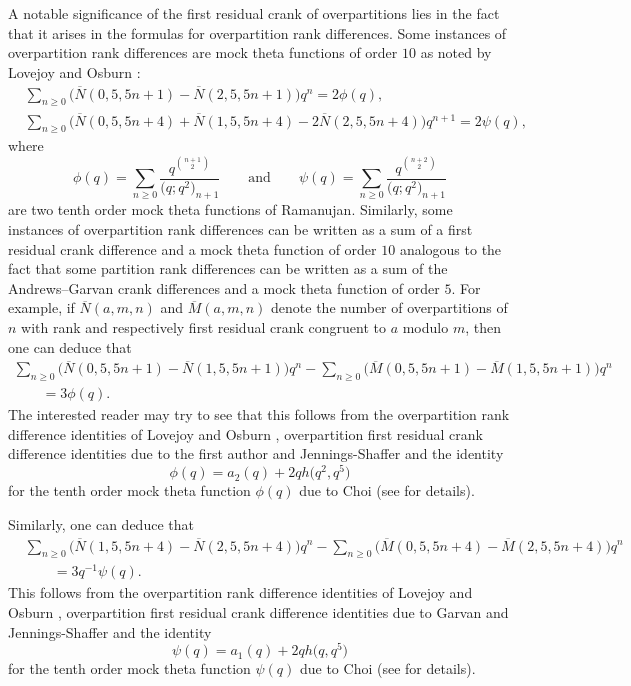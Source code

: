 \documentclass[pdftex]{sigma}
\numberwithin{equation}{section}
\begin{document}
A notable significance of the first residual crank of overpartitions lies in the fact that it arises in the formulas for overpartition rank differences. Some instances of overpartition rank differences are mock theta functions of order $10$ as noted by Lovejoy and Osburn \cite[p.~197]{Lo-Os10}:
\begin{align*}
&\sum_{n\geq 0}\bigl(\overline{N}(0,5,5n+1)-\overline{N}(2,5,5n+1)\bigr)q^n=2\phi(q),
\\
&\sum_{n\geq 0}\bigl(\overline{N}(0,5,5n+4)+\overline{N}(1,5,5n+4)-2\overline{N}(2,5,5n+4)\bigr)q^{n+1}=2\psi(q),
\end{align*}
where
\begin{equation*}
\phi(q)=\sum\limits_{n\geq 0}\frac{q^{\binom{n+1}{2}}}{\bigl(q;q^2\bigr)_{n+1}}
\qquad\mbox{and}\qquad
\psi(q)=\sum\limits_{n\geq 0}\frac{q^{\binom{n+2}{2}}}{\bigl(q;q^2\bigr)_{n+1}}
\end{equation*}
are two tenth order mock theta functions of Ramanujan.
Similarly, some instances of overpartition rank differences can be written as a sum of a first residual crank difference and a mock theta function of order $10$ analogous to the fact that some partition rank differences can be written as a sum of the Andrews--Garvan crank differences and a mock theta function of order $5$. For example, if $\overline{N}(a,m,n)$ and $\overline{M}(a,m,n)$ denote the number of overpartitions of $n$ with rank and respectively first residual crank congruent to $a$ modulo $m$, then one can deduce that
\begin{gather*}
\sum_{n\geq 0}\bigl(\overline{N}(0,5,5n+1)-\overline{N}(1,5,5n+1)\bigr)q^n-\sum_{n\geq 0}\bigl(\overline{M}(0,5,5n+1)-\overline{M}(1,5,5n+1)\bigr)q^n \\
\qquad{}=3\phi(q).
\end{gather*}
The interested reader may try to see that this follows from the overpartition rank difference identities of Lovejoy and Osburn {\cite[equations~(1.6) and~(1.11)]{Lo-Os08}}, overpartition first residual crank difference identities due to the first author and Jennings-Shaffer \cite[Theorem~2.10]{Ga-Sh} and the identity
\begin{equation*}%
\phi(q)=a_2(q)+2qh\bigl(q^2,q^5\bigr)
\end{equation*}
for the tenth order mock theta function $\phi(q)$ due to Choi (see \cite[p. 534]{Ch99} for details).

Similarly, one can deduce that
\begin{align*}
&{}\sum_{n\geq 0}\bigl(\overline{N}(1,5,5n+4)-\overline{N}(2,5,5n+4)\bigr)q^n-\sum_{n\geq 0}\bigl(\overline{M}(0,5,5n+4)-\overline{M}(2,5,5n+4)\bigr)q^n \\
&{}\qquad{}=3q^{-1}\psi(q).
\end{align*}
This follows from the overpartition rank difference identities of Lovejoy and Osburn \cite[equations~(1.6) and~(1.11)]{Lo-Os08}, overpartition first residual crank difference identities due to Garvan and Jennings-Shaffer \cite[Theorem~2.10]{Ga-Sh} and the identity
\begin{equation*}
\psi(q)=a_1(q)+2qh\bigl(q,q^5\bigr)
\end{equation*}
for the tenth order mock theta function $\psi(q)$ due to Choi (see \cite[p.~533]{Ch99} for details).
\end{document}
